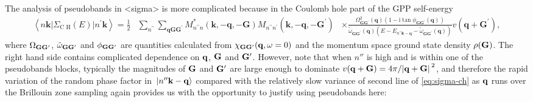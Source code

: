 \documentclass[hyperref, a4paper]{article}
\newcommand*{\ii}{\mathrm{i}}
\def\\{}%
\def\texttt#1{<#1>}%
\newcommand{\shortcode}[1]{\texttt{#1}}
\begin{document}
The analysis of pseudobands in \shortcode{sigma} is more complicated
because in the Coulomb hole part of the GPP self-energy
\begin{equation}
    \begin{aligned}
        \left\langle n \mathbf{k}\left|\Sigma_{\text{C H}}(E)\right| n^{\prime} \mathbf{k}\right\rangle=\frac{1}{2} & \sum_{n^{\prime \prime}} \sum_{\mathbf{q G G}^{\prime}} M_{n^{\prime \prime} n}^*(\mathbf{k},-\mathbf{q},-\mathbf{G}) M_{n^{\prime \prime} n^{\prime}}\left(\mathbf{k},-\mathbf{q},-\mathbf{G}^{\prime}\right) \\
        & \times \frac{\Omega_{\mathbf{G G}^{\prime}}^2(\mathbf{q})\left(1- \ii \tan \phi_{\mathbf{G G}^{\prime}}(\mathbf{q})\right)}{\tilde{\omega}_{\mathbf{G G}^{\prime}}(\mathbf{q})\left(E-E_{n^{\prime \prime} \mathbf{k}-\mathbf{q}}-\tilde{\omega}_{\mathbf{G G}^{\prime}}(\mathbf{q})\right)} v\left(\mathbf{q}+\mathbf{G}^{\prime}\right),
    \end{aligned}
    \label{eq:sigma-ch}
\end{equation}
where $\Omega_{\vb{G} \vb{G}'}$, $\tilde{\omega}_{\vb{G} \vb{G}'}$ and $\phi_{\vb{G} \vb{G}'}$
are quantities calculated from $\chi_{\vb{G} \vb{G}'}(\vb{q}, \omega = 0)$ 
and the momentum space ground state density $\rho(\vb{G})$.
The right hand side contains complicated dependence on $\vb{q}$, $\vb{G}$ and $\vb{G}'$.
However, note that when $n''$ is high and is within one of the pseudobands blocks,
typically the magnitudes of $\vb{G}$ and $\vb{G}'$ are large enough 
to dominate $v(\vb{q} + \vb{G}) = 4 \pi / \abs*{\vb{q} + \vb{G}}^2$, 
and therefore the rapid variation of the random phase factor in $\ket*{n'' \vb{k} - \vb{q}}$ 
compared with the relatively slow variance of second line of \eqref{eq:sigma-ch}
as $\vb{q}$ runs over the Brillouin zone sampling
again provides us with the opportunity to justify using pseudobands here:
\end{document}

